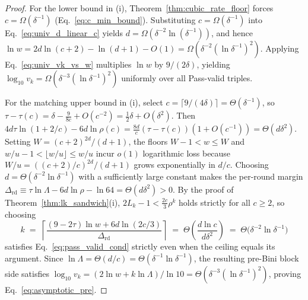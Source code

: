 \documentclass[11pt,a4paper]{article}
\theoremstyle{plain}
\theoremstyle{definition}
\theoremstyle{remark}
\begin{document}
\begin{proof}
For the lower bound in (i), Theorem~\ref{thm:cubic_rate_floor} forces $c = \Omega(\delta^{-1})$ (Eq.~\eqref{eq:c_min_bound}). Substituting $c = \Omega(\delta^{-1})$ into Eq.~\eqref{eq:univ_d_linear_c} yields $d = \Omega(\delta^{-2} \ln(\delta^{-1}))$, and hence $\ln w = 2d\ln(c + 2) - \ln(d + 1) - O(1) = \Omega(\delta^{-2}(\ln \delta^{-1})^2)$. Applying Eq.~\eqref{eq:univ_vk_vs_w} multiplies $\ln w$ by $9/(2\delta)$, yielding $\log_{10} v_k = \Omega(\delta^{-3}(\ln \delta^{-1})^2)$ uniformly over all Pass-valid triples.

For the matching upper bound in (i), select $c = \lceil 9/(4\delta) \rceil = \Theta(\delta^{-1})$, so $\tau - \tau(c) = \delta - \frac{9}{8c} + O(c^{-2}) = \frac{1}{2}\delta + O(\delta^2)$. Then $4d\tau\ln(1 + 2/c) - 6d\ln\rho(c) = \frac{8d}{c}(\tau - \tau(c))(1 + O(c^{-1})) = \Theta(d \delta^2)$. Setting $W = (c + 2)^{2d}/(d + 1)$, the floors $W - 1 < w \le W$ and $w/u - 1 < \lfloor w/u \rfloor \le w/u$ incur $o(1)$ logarithmic loss because $W/u = ((c + 2)/c)^{2d}/(d + 1)$ grows exponentially in $d/c$. Choosing $d = \Theta(\delta^{-2}\ln\delta^{-1})$ with a sufficiently large constant makes the per-round margin $\Delta_{\mathrm{rd}} \equiv \tau\ln\Lambda - 6d\ln\rho - \ln 64 = \Theta(d\delta^2) > 0$. By the proof of Theorem~\ref{thm:lk_sandwich}(i), $2 L_k - 1 < \frac{2c}{3}\rho^k$ holds strictly for all $c \ge 2$, so choosing
\begin{equation}
    k \;=\; \left\lceil \frac{(9 - 2\tau)\ln w + 6d\ln(2c/3)}{\Delta_{\mathrm{rd}}} \right\rceil \;=\; \Theta\!\left(\frac{d\ln c}{d\delta^2}\right) \;=\; \Theta\!\bigl(\delta^{-2}\ln\delta^{-1}\bigr)
    \label{eq:k_scaling}
\end{equation}
satisfies Eq.~\eqref{eq:pass_valid_cond} strictly even when the ceiling equals its argument. Since $\ln\Lambda = \Theta(d/c) = \Theta(\delta^{-1}\ln\delta^{-1})$, the resulting pre-Bini block side satisfies $\log_{10} v_k = (2\ln w + k\ln\Lambda)/\ln 10 = \Theta(\delta^{-3}(\ln\delta^{-1})^2)$, proving Eq.~\eqref{eq:asymptotic_pre}.


\end{proof}
\end{document}
